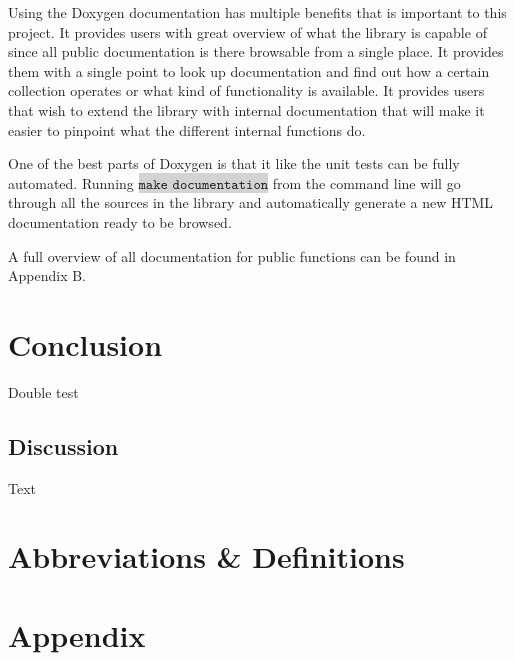 \documentclass[table]{ituthesis}
\newcommand{\highlight}[1]{\colorbox{lightGray}{$\displaystyle \texttt{#1}$}}
\begin{document}
	Using the Doxygen documentation has multiple benefits that is important to this project. It provides users with great overview of what the library is capable of since all public documentation is there browsable from a single place. It provides them with a single point to look up documentation and find out how a certain collection operates or what kind of functionality is available. It provides users that wish to extend the library with internal documentation that will make it easier to pinpoint what the different internal functions do.
	
	One of the best parts of Doxygen is that it like the unit tests can be fully automated. Running \highlight{make documentation} from the command line will go through all the sources in the library and automatically generate a new HTML documentation ready to be browsed.

	A full overview of all documentation for public functions can be found in Appendix B.

\chapter{Conclusion}
	Double test
	\section{Discussion}
	\label{sec:discussion}
	Text

\chapter{Abbreviations \& Definitions}
\begin{acronym}
	
\end{acronym}

\chapter{Appendix}
\appendix
	
\end{document}
